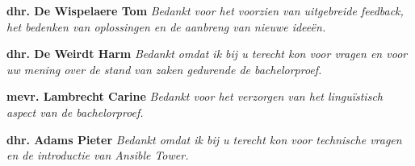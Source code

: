 \begin{center}
	
	
		\large{\textbf{dhr. De Wispelaere Tom}}\newline
	\textit{Bedankt voor het voorzien van uitgebreide feedback, het bedenken van oplossingen en de aanbreng van nieuwe idee\"en.}\newline
	
			\large{\textbf{dhr. De Weirdt Harm}}\newline
	\textit{Bedankt omdat ik bij u terecht kon voor vragen en voor uw mening over de stand van zaken gedurende de bachelorproef.}\newline
	
		\large{\textbf{mevr. Lambrecht Carine}}\newline
	\textit{Bedankt voor het verzorgen van het lingu\"istisch aspect van de bachelorproef.}\newline
	
		\large{\textbf{dhr. Adams Pieter}}\newline
	\textit{Bedankt omdat ik bij u terecht kon voor technische vragen en de introductie van Ansible Tower.}\newline
	


\end{center}
